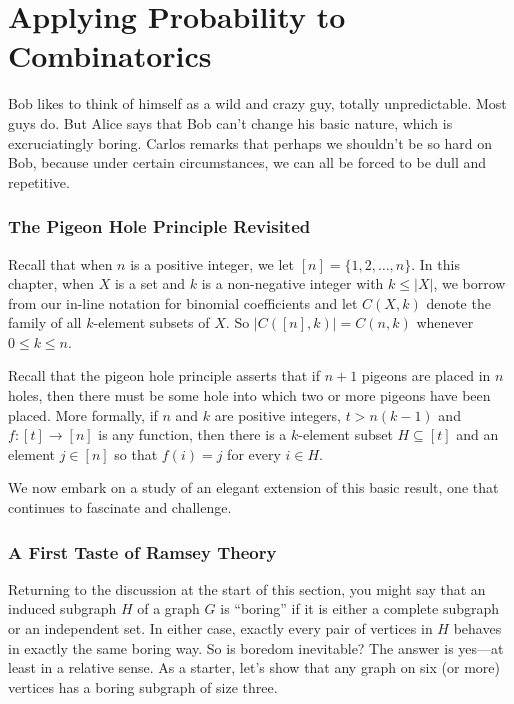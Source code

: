 
\chapter{Applying Probability to Combinatorics}\label{ch:probmeth}

Bob likes to think of himself as a wild and crazy guy, totally 
unpredictable.  Most guys do.  But Alice says that Bob
can't change his basic nature, which is excruciatingly
boring.  Carlos remarks that perhaps we shouldn't be
so hard on Bob, because under certain circumstances, we
can all be forced to be dull and repetitive. 

\subsection{The Pigeon Hole Principle Revisited}

Recall that when $n$ is a positive integer, 
we let $[n]=\{1,2,\dots,n\}$.  In this chapter, when $X$ is
a set and $k$ is a non-negative integer with $k\le |X|$, we
borrow from our in-line notation for binomial coefficients
and let $C(X,k)$ denote the family of all $k$-element subsets
of $X$.  So $|C([n],k)|=C(n,k)$ whenever $0\le k\le n$.

Recall that the pigeon hole principle asserts that if
$n+1$ pigeons are placed in $n$ holes, then there must
be some hole into which two or more pigeons have been
placed.  More formally, if $n$ and $k$ are positive integers,
$t>n(k-1)$ and $f:[t]\longrightarrow[n]$ is any function,
then there is a $k$-element subset $H\subseteq [t]$ and
an element $j\in[n]$ so that $f(i)=j$ for every $i\in H$.

We now embark on a study of an elegant extension of this
basic result, one that continues to fascinate and challenge.

\subsection{A First Taste of Ramsey Theory}

Returning to the discussion at the start of this section,
you might say that an induced subgraph $H$ of a graph $G$ is
``boring'' if it is either a complete subgraph or
an independent set.  In either case, exactly every pair
of vertices in $H$ behaves in exactly the same boring way.
So is boredom inevitable?  The answer is yes---at least
in a relative sense.  As a starter, let's show that
any graph on six (or more) vertices has a boring subgraph
of size three.

